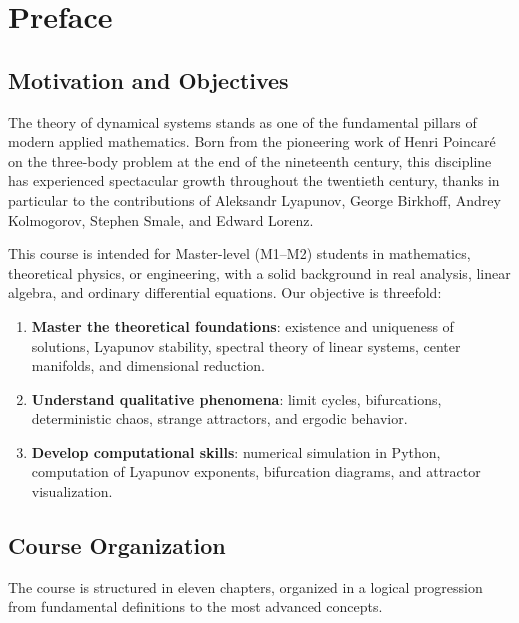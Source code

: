 \chapter*{Preface}

\section*{Motivation and Objectives}

The theory of dynamical systems stands as one of the fundamental pillars of
modern applied mathematics. Born from the pioneering work of Henri Poincar\'e
on the three-body problem at the end of the nineteenth century, this discipline
has experienced spectacular growth throughout the twentieth century, thanks
in particular to the contributions of Aleksandr Lyapunov, George Birkhoff,
Andrey Kolmogorov, Stephen Smale, and Edward Lorenz.

This course is intended for Master-level (M1--M2) students in mathematics,
theoretical physics, or engineering, with a solid background in real analysis,
linear algebra, and ordinary differential equations. Our objective is
threefold:

\begin{enumerate}
    \item \textbf{Master the theoretical foundations}: existence and uniqueness
    of solutions, Lyapunov stability, spectral theory of linear systems,
    center manifolds, and dimensional reduction.

    \item \textbf{Understand qualitative phenomena}: limit cycles,
    bifurcations, deterministic chaos, strange attractors, and ergodic
    behavior.

    \item \textbf{Develop computational skills}: numerical simulation in
    Python, computation of Lyapunov exponents, bifurcation diagrams, and
    attractor visualization.
\end{enumerate}

\section*{Course Organization}

The course is structured in eleven chapters, organized in a logical
progression from fundamental definitions to the most advanced concepts.

